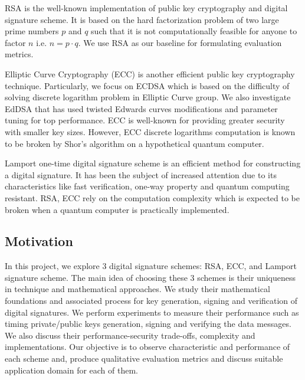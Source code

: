 \documentclass[10pt,sigconf]{acmart}
\begin{document}
RSA \cite{Rivest:1978:MOD:359340.359342} is the well-known implementation of public key cryptography and digital signature scheme. It is based on the hard factorization problem of two large prime numbers $p$ and $q$ such that it is not computationally feasible for anyone to factor $n$ i.e. $n = p \cdot q$. We use RSA as our baseline for formulating evaluation metrics.

Elliptic Curve Cryptography (ECC) is another efficient public key cryptography technique. Particularly, we focus on ECDSA \cite{Kerry13fipspub} which is based on the difficulty of solving discrete logarithm problem in Elliptic Curve group. %
We also investigate EdDSA \cite{Bernstein2012} that has used twisted Edwards curves modifications and parameter tuning for top performance. ECC is well-known for providing greater security with smaller key sizes. %
However, ECC discrete logarithms computation is known to be broken by Shor's algorithm \cite{Shor:1997:PAP:264393.264406} on a hypothetical quantum computer.

Lamport one-time digital signature scheme \cite{lamport} is an efficient method for constructing a digital signature. %
It has been the subject of increased attention due to its characteristics like fast verification, one-way property and quantum computing resistant. RSA, ECC rely on the computation complexity which is expected to be broken when a quantum computer is practically implemented.

\subsection{Motivation}

In this project, we explore 3 digital signature schemes: RSA, ECC, and Lamport signature scheme. The main idea of choosing these 3 schemes is their uniqueness in technique and mathematical approaches. We study their mathematical foundations and associated process for key generation, signing and verification of digital signatures. We perform experiments to measure their performance such as timing private/public keys generation, signing and verifying the data messages. We also discuss their performance-security trade-offs, complexity and implementations. Our objective is to observe characteristic and performance of each scheme and, produce qualitative evaluation metrics and discuss suitable application domain for each of them.
\end{document}

